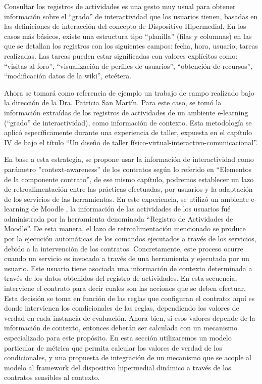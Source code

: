 \begin{itemize}
Consultar los registros de actividades es una gesto muy usual para obtener
información sobre el “grado” de interactividad que los usuarios \cite{arqDHD3} tienen, basadas en las definiciones de interacción del concepto de Dispositivo Hipermedial. En los casos más básicos, existe una estructura tipo “planilla” (filas y columnas) en las que se detallan los registros con los siguientes campos: fecha, hora, usuario, tareas realizadas. Las tareas pueden estar significadas con valores explícitos como: “visitas al foro”, “visualización de perfiles de usuarios”, “obtención de recursos”, “modificación datos de la wiki”, etcétera.

Ahora se tomará como referencia de ejemplo un trabajo de campo realizado bajo la dirección de la Dra. Patricia San Martín. Para este caso, se tomó la información extraídas de los registros de actividades de un ambiente e-learning (“grado” de interactividad), como información de contexto. Esta metodología se aplicó específicamente durante una experiencia de taller, expuesta en el capítulo IV de \cite{DHD} bajo el título “Un diseño de taller físico-virtual-interactivo-comunicacional”.

En base a esta estrategia, se propone usar la información de interactividad como parámetro ''context-awareness'' de los contratos según lo referido en “Elementos de la componente contrato”, de ese mismo capítulo, podremos establecer un lazo de retroalimentación entre las prácticas efectuadas, por usuarios y la adaptación de los servicios de las herramientas. En este experiencia, se utilizó un ambiente e-learning de Moodle \cite{Moodle}, la información de las actividades de los usuarios fué administrada por la herramienta denominada ``Registro de Actividades de Moodle''. De esta manera, el lazo de retroalimentación mencionado se produce por la ejecución automáticas de los comandos ejecutados a través de los servicios, debido a la intervención de los contratos. Concretamente, este proceso ocurre cuando un servicio es invocado a través de una herramienta y ejecutada por un usuario. Este usuario tiene asociada una información de contexto determinada a través de los datos obtenidos del registro de actividades. En esta secuencia, interviene el contrato para decir cuales son las acciones que se deben efectuar. Esta decisión se toma en función de las reglas que configuran el contrato; aquí es donde intervienen los condicionales de las reglas, dependiendo los valores de verdad en cada instancia de evaluación. Ahora bien, si esos valores depende de la información de contexto, entonces deberán ser calculada con un mecanismo especializado para este propósito. En esta sección utilizaremos un modelo particular de métrica que permita calcular los valores de verdad de los condicionales, y una propuesta de integración de un mecanismo que se acople al modelo al framework del dispositivo hipermedial dinámico a través de los contratos sensibles al contexto.



\end{itemize}

